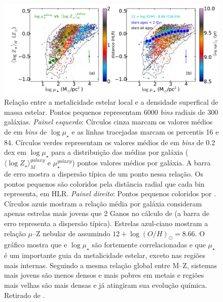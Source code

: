 \begin{figure}
  \includegraphics[scale=0.35]{figuras/Fig_age_logZ_zonas_Bgsd01.pdf}
  \caption[ $\times\ \log \mu_\star$]
  {Relação entre a metalicidade estelar local e a densidade superfical de massa estelar. Pontos pequenos representam 6000 {\em bins} radiais de 300 galáxias. {\em Painel esquerdo}: Círculos cinza marcam os valores médios de  em {\em bins} de $\log \mu_\star$ e as linhas tracejadas marcam os percentis 16 e 84. Círculos verdes representam os valores médios de  em {\em bins} de 0.2 dex em $\log \mu_\star$ para a distribuição das médias por galáxia ($\langle \log Z_\star \rangle_M^{galaxy}$ e $\mu_\star^{galaxy}$) pontos valores médios por galáxia. A barra de erro mostra a dispersão típica de um ponto nessa relação. Os pontos pequenos são coloridos pela distância radial que cada bin representa, em HLR. {\em Painel direito}: Pontos pequenos coloridos por . Círculos azuis mostram a relação média por galáxia consideram apenas estrelas mais jovens que 2 Ganos no cálculo de  (a barra de erro representa a dispersão típica). Estrelas azul-ciano mostram a relação $\mu$--Z nebular de \citet{Sanchez.etal.2013a} assumindo $12+ \log (O/H)_\odot = 8.66$. O gráfico mostra que  e $\log \mu_\star$ são fortemente correlacionadas e que $\mu_\star$ é um importante guia da metalicidade estelar, exceto nas regiões mais internas. Seguindo a mesma relação global entre M--Z, sistemas mais jovens são menos densos e mais pobres em metais e regiões mais velhas são mais densas e já atingiram sua evolução química. Retirado de \citet{GonzalezDelgado.etal.2014b}.}
  \label{fig:McorSD_logZ_zonas}
\end{figure}

